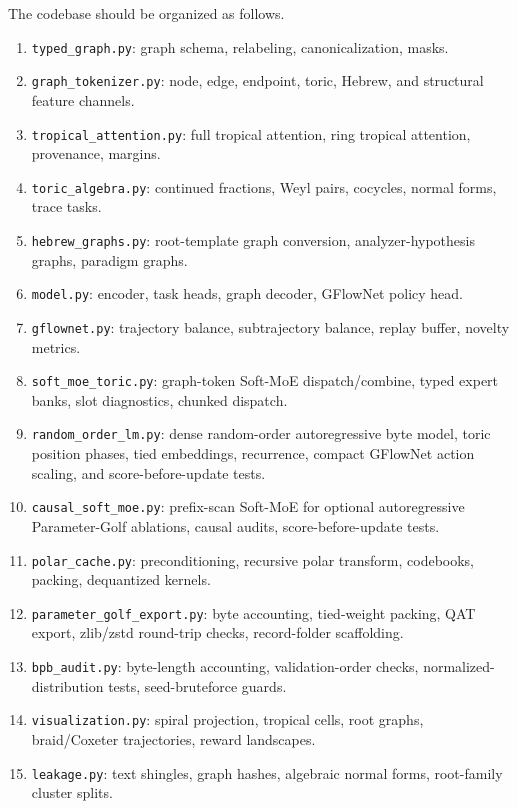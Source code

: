 \documentclass[11pt]{article}
\theoremstyle{definition}
\theoremstyle{plain}
\theoremstyle{remark}
\numberwithin{equation}{section}
\begin{document}
The codebase should be organized as follows.
\begin{enumerate}[leftmargin=2em]
  \item \texttt{typed\_graph.py}: graph schema, relabeling, canonicalization, masks.
  \item \texttt{graph\_tokenizer.py}: node, edge, endpoint, toric, Hebrew, and structural feature channels.
  \item \texttt{tropical\_attention.py}: full tropical attention, ring tropical attention, provenance, margins.
  \item \texttt{toric\_algebra.py}: continued fractions, Weyl pairs, cocycles, normal forms, trace tasks.
  \item \texttt{hebrew\_graphs.py}: root-template graph conversion, analyzer-hypothesis graphs, paradigm graphs.
  \item \texttt{model.py}: encoder, task heads, graph decoder, GFlowNet policy head.
  \item \texttt{gflownet.py}: trajectory balance, subtrajectory balance, replay buffer, novelty metrics.
  \item \texttt{soft\_moe\_toric.py}: graph-token Soft-MoE dispatch/combine, typed expert banks, slot diagnostics, chunked dispatch.
  \item \texttt{random\_order\_lm.py}: dense random-order autoregressive byte model, toric position phases, tied embeddings, recurrence, compact GFlowNet action scaling, and score-before-update tests.
  \item \texttt{causal\_soft\_moe.py}: prefix-scan Soft-MoE for optional autoregressive Parameter-Golf ablations, causal audits, score-before-update tests.
  \item \texttt{polar\_cache.py}: preconditioning, recursive polar transform, codebooks, packing, dequantized kernels.
  \item \texttt{parameter\_golf\_export.py}: byte accounting, tied-weight packing, QAT export, zlib/zstd round-trip checks, record-folder scaffolding.
  \item \texttt{bpb\_audit.py}: byte-length accounting, validation-order checks, normalized-distribution tests, seed-bruteforce guards.
  \item \texttt{visualization.py}: spiral projection, tropical cells, root graphs, braid/Coxeter trajectories, reward landscapes.
  \item \texttt{leakage.py}: text shingles, graph hashes, algebraic normal forms, root-family cluster splits.
\end{enumerate}
\end{document}
